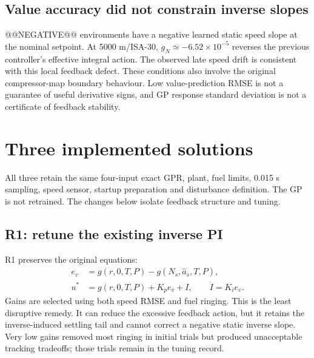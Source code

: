 \subsection{Value accuracy did not constrain inverse slopes}
@@NEGATIVE@@ environments have a negative learned static speed slope at the nominal setpoint. At 5000 m/ISA-30, $g_N\simeq-6.52\times10^{-5}$ reverses the previous controller's effective integral action. The observed late speed drift is consistent with this local feedback defect. These conditions also involve the original compressor-map boundary behaviour. Low value-prediction RMSE is not a guarantee of useful derivative signs, and GP response standard deviation is not a certificate of feedback stability.

\section{Three implemented solutions}
All three retain the same four-input exact GPR, plant, fuel limits, 0.015 s sampling, speed sensor, startup preparation and disturbance definition. The GP is not retrained. The changes below isolate feedback structure and tuning.

\subsection{R1: retune the existing inverse PI}
R1 preserves the original equations:
\begin{align}
e_v&=g(r,0,T,P)-g(N_s,\hat a_s,T,P),\\
u^*&=g(r,0,T,P)+K_pe_v+I,\qquad \dot I=K_i e_v.
\end{align}
Gains are selected using both speed RMSE and fuel ringing. This is the least disruptive remedy. It can reduce the excessive feedback action, but it retains the inverse-induced settling tail and cannot correct a negative static inverse slope. Very low gains removed most ringing in initial trials but produced unacceptable tracking tradeoffs; those trials remain in the tuning record.

